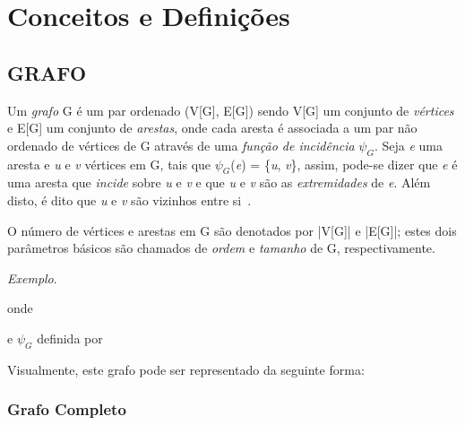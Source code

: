 \chapter{Conceitos e Definições}
\label{conceitos}

\section{\texorpdfstring{\MakeUppercase{Grafo}}{}}
\label{conceitos__grafo}

Um \emph{grafo} G é um par ordenado (V[G], E[G]) sendo V[G] um conjunto de \emph{vértices} e E[G] um conjunto de \emph{arestas}, onde cada aresta é associada a um par não ordenado de vértices de G através de uma \emph{função de incidência} $\psi_{G}$. Seja \emph{e} uma aresta e \emph{u} e \emph{v} vértices em G, tais que $\psi_{G}$(\emph{e}) = \{\emph{u}, \emph{v}\}, assim, pode-se dizer que \emph{e} é uma aresta que \emph{incide} sobre \emph{u} e \emph{v} e que \emph{u} e \emph{v} são as \emph{extremidades} de \emph{e}. Além disto, é dito que \emph{u} e \emph{v} são vizinhos entre si~\cite{bondy1976graph}.

O número de vértices e arestas em G são denotados por |V[G]| e |E[G]|; estes
dois parâmetros básicos são chamados de \emph{ordem} e \emph{tamanho} de G, respectivamente.

\noindent\emph{Exemplo}.


\noindent onde



\noindent e $\psi_{G}$ definida por



Visualmente, este grafo pode ser representado da seguinte forma:



\subsection{Grafo Completo}
\label{conceitos__grafo--comleto}

